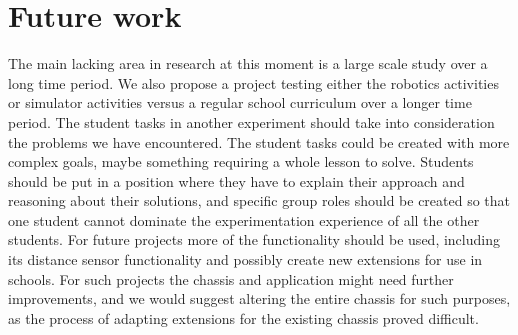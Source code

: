 \section{Future work}
The main lacking area in research at this moment is a large scale study over a long time period. We also propose a project testing either the robotics activities or simulator activities versus a regular school curriculum over a longer time period. 
The student tasks in another experiment should take into consideration the problems we have encountered. 
The student tasks could be created with more complex goals, maybe something requiring a whole lesson to solve. 
Students should be put in a position where they have to explain their approach and reasoning about their solutions, and specific group roles should be created so that one student cannot dominate the experimentation experience of all the other students. 
For future projects more of the \chirp functionality should be used, including its distance sensor functionality and possibly create new extensions for use in schools.
For such projects the chassis and application might need further improvements, and we would suggest altering the entire chassis for such purposes, as the process of adapting extensions for the existing chassis proved difficult. 
